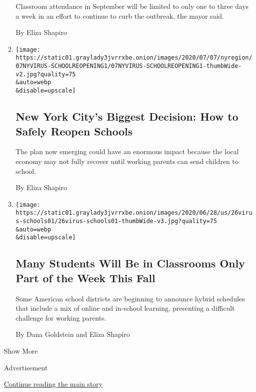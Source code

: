 \begin{enumerate}
  Classroom attendance in September will be limited to only one to three
  days a week in an effort to continue to curb the outbreak, the mayor
  said.

  By Eliza Shapiro
\item
  \href{/2020/07/06/nyregion/nyc-school-reopening-plan.html}{}

  \texttt{[image: https://static01.graylady3jvrrxbe.onion/images/2020/07/07/nyregion/07NYVIRUS-SCHOOLREOPENING1/07NYVIRUS-SCHOOLREOPENING1-thumbWide-v2.jpg?quality=75\\\&auto=webp\\\&disable=upscale]}

  \hypertarget{new-york-citys-biggest-decision-how-to-safely-reopen-schools}{%
  \subsection{New York City's Biggest Decision: How to Safely Reopen
  Schools}\label{new-york-citys-biggest-decision-how-to-safely-reopen-schools}}

  The plan now emerging could have an enormous impact because the local
  economy may not fully recover until working parents can send children
  to school.

  By Eliza Shapiro
\item
  \href{/2020/06/26/us/coronavirus-schools-reopen-fall.html}{}

  \texttt{[image: https://static01.graylady3jvrrxbe.onion/images/2020/06/28/us/26virus-schools01/26virus-schools01-thumbWide-v3.jpg?quality=75\\\&auto=webp\\\&disable=upscale]}

  \hypertarget{many-students-will-be-in-classrooms-only-part-of-the-week-this-fall}{%
  \subsection{Many Students Will Be in Classrooms Only Part of the Week
  This
  Fall}\label{many-students-will-be-in-classrooms-only-part-of-the-week-this-fall}}

  Some American school districts are beginning to announce hybrid
  schedules that include a mix of online and in-school learning,
  presenting a difficult challenge for working parents.

  By Dana Goldstein and Eliza Shapiro
\end{enumerate}

Show More

Advertisement

\protect\hyperlink{after-mid2}{Continue reading the main story}

